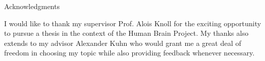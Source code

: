 \thispagestyle{empty}

\vspace*{20mm}

\begin{center}
{ Acknowledgments}
\end{center}
I would like to thank my supervisor Prof. Alois Knoll for the exciting opportunity to pursue a thesis in the context of the Human Brain Project. My thanks also extends to my advisor Alexander Kuhn who would grant me a great deal of freedom in choosing my topic while also providing feedback whenever necessary.

\vspace{10mm}


\cleardoublepage{}
